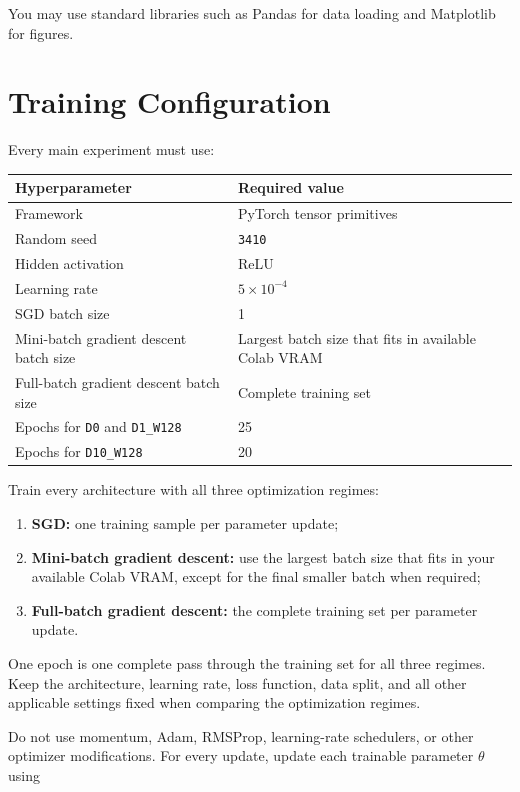 \documentclass[11pt,a4paper]{article}
\newcommand{\code}[1]{\texttt{#1}}
\begin{document}
You may use standard libraries such as Pandas for data loading and Matplotlib for figures.

\section{Training Configuration}

Every main experiment must use:

\begin{center}
\begin{tabular}{ll}
\toprule
\textbf{Hyperparameter} & \textbf{Required value} \\
\midrule
Framework & PyTorch tensor primitives \\
Random seed & \code{3410} \\
Hidden activation & ReLU \\
Learning rate & $5\times10^{-4}$ \\
SGD batch size & 1 \\
Mini-batch gradient descent batch size & Largest batch size that fits in available Colab VRAM \\
Full-batch gradient descent batch size & Complete training set \\
Epochs for \code{D0} and \code{D1\_W128} & 25 \\
Epochs for \code{D10\_W128} & 20 \\
\bottomrule
\end{tabular}
\end{center}

Train every architecture with all three optimization regimes:

\begin{enumerate}
    \item \textbf{SGD:} one training sample per parameter update;
    \item \textbf{Mini-batch gradient descent:} use the largest batch size that fits in your available Colab VRAM, except for the final smaller batch when required;
    \item \textbf{Full-batch gradient descent:} the complete training set per parameter update.
\end{enumerate}

One epoch is one complete pass through the training set for all three regimes. Keep the architecture, learning rate, loss function, data split, and all other applicable settings fixed when comparing the optimization regimes.

Do not use momentum, Adam, RMSProp, learning-rate schedulers, or other optimizer modifications. For every update, update each trainable parameter $\theta$ using
\end{document}
